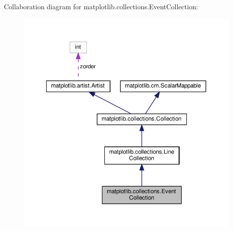 Collaboration diagram for matplotlib.\+collections.\+Event\+Collection\+:
\nopagebreak
\begin{figure}[H]
\begin{center}
\leavevmode
\includegraphics[width=350pt]{classmatplotlib_1_1collections_1_1EventCollection__coll__graph}
\end{center}
\end{figure}
